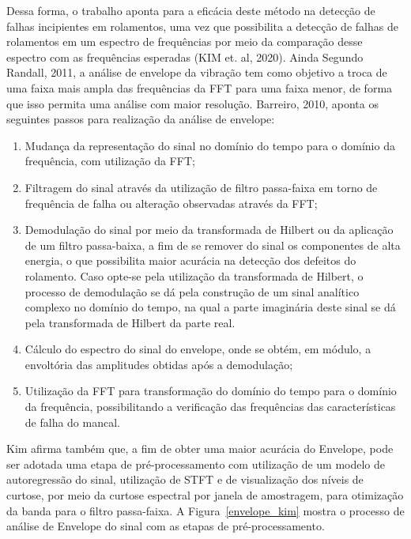 \documentclass[
	12pt,				
	oneside,			
	a4paper,			
	english,			
	brazil,	
	sumario=abnt-6027-2012		
	]{abntex2ppgsi}
\begin{document}
Dessa forma, o trabalho aponta para a eficácia deste método na detecção de falhas incipientes em rolamentos, uma vez que possibilita a detecção de falhas de rolamentos em um espectro de frequências por meio da comparação desse espectro com as frequências esperadas (KIM et. al, 2020). Ainda Segundo Randall, 2011, a análise de envelope da vibração tem como objetivo a troca de uma faixa mais ampla das frequências da FFT para uma faixa menor, de forma que isso permita uma análise com maior resolução. Barreiro, 2010, aponta os seguintes passos para realização da análise de envelope:

\begin{enumerate}
	\item Mudança da representação do sinal no domínio do tempo para o domínio da frequência, com utilização da FFT;
	\item Filtragem do sinal através da utilização de filtro passa-faixa em torno de frequência de falha ou alteração observadas através da FFT;
	\item Demodulação do sinal por meio da transformada de Hilbert ou da aplicação de um filtro passa-baixa, a fim de se remover do sinal os componentes de alta energia, o que possibilita maior acurácia na detecção dos defeitos do rolamento. Caso opte-se pela utilização da transformada de Hilbert, o processo de demodulação se dá pela construção de um sinal analítico complexo no domínio do tempo, na qual a parte imaginária deste sinal se dá pela transformada de Hilbert da parte real.  
	\item Cálculo do espectro do sinal do envelope, onde se obtém, em módulo, a envoltória das amplitudes obtidas após a demodulação;
	\item Utilização da FFT para transformação do domínio do tempo para o domínio da frequência, possibilitando a verificação das frequências das características de falha do mancal.
\end{enumerate}

Kim afirma também que, a fim de obter uma maior acurácia do Envelope, pode ser adotada uma etapa de pré-processamento com utilização de um modelo de autoregressão do sinal, utilização de STFT e de visualização dos níveis de curtose, por meio da curtose espectral por janela de amostragem, para otimização da banda para o filtro passa-faixa. A Figura~\ref{envelope_kim} mostra o processo de análise de Envelope do sinal com as etapas de pré-processamento. 
\end{document}
